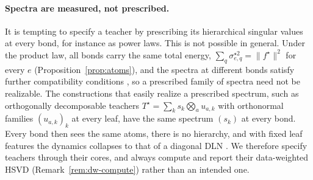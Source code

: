 \documentclass[11pt]{article}
\newcommand{\norm}[1]{\lVert #1\rVert}
\theoremstyle{definition}
\numberwithin{equation}{section}
\begin{document}
\paragraph{Spectra are measured, not prescribed.}
It is tempting to specify a teacher by prescribing its hierarchical singular values at every bond, for instance as power laws. This is not possible in general. Under the product law, all bonds carry the same total energy, $\sum_q\sigma^{\star2}_{e,q}=\norm{f^\star}^2$ for every $e$ (Proposition~\ref{prop:atoms}), and the spectra at different bonds satisfy further compatibility conditions \citep{hackbusch2017interconnection}, so a prescribed family of spectra need not be realizable. The constructions that easily realize a prescribed spectrum, such as orthogonally decomposable teachers $T^\star=\sum_ks_k\bigotimes_au_{a,k}$ with orthonormal families $(u_{a,k})_k$ at every leaf, have the same spectrum $(s_k)$ at every bond. Every bond then sees the same atoms, there is no hierarchy, and with fixed leaf features the dynamics collapses to that of a diagonal DLN \citep[Proposition~4.1]{hfl_diagonal}. We therefore specify teachers through their cores, and always compute and report their data-weighted HSVD (Remark~\ref{rem:dw-compute}) rather than an intended one.
\end{document}
